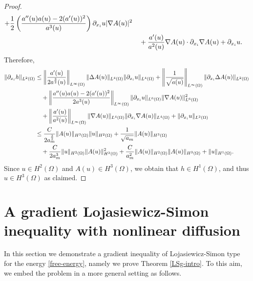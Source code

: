 \documentclass[11pt,reqno]{amsart}
\theoremstyle{remark}
\def\u{u}
\numberwithin{equation}{section}
\begin{document}
\begin{proof}
\begin{align}
+\frac12 \left( \frac{a''(u)a(u)- 2 (a'(u))^2}{a^3(u)} \right)  \partial_{x_i} u   | \nabla A(u)|^2
\notag
\\
&\quad + \frac{a'(u)}{a^2(u)} \nabla A(u) \cdot \partial_{x_i} \nabla A(u)
+ \partial_{x_i} u.
\label{h1}
\end{align}
Therefore, 
\begin{align}
\|\partial_{x_i} h\|_{L^2(\Omega)}
&\leq \left\|\frac{a'(u)}{2a^\frac32 (u)}\right\|_{L^\infty(\Omega)}\| \Delta A(u)\|_{L^4(\Omega)}\| \partial_{x_i} u\|_{L^4(\Omega)}
+ \left\|\frac{1}{\sqrt{a(u)}}\right\|_{L^\infty(\Omega)}\| \partial_{x_i}\Delta A(u)\|_{L^2(\Omega)}
\notag
\\
&\quad+\left\|\frac{a''(u)a(u)- 2 (a'(u))^2}{2a^3(u)} \right\|_{L^\infty(\Omega)}\|  \partial_{x_i} u\|_{L^6(\Omega)}\| \nabla A(u)\|_{L^6(\Omega)}^2
\notag
\\
&\quad  +\left\|\frac{a'(u)}{a^2(u)}\right\|_{L^\infty(\Omega)}\| \nabla A(u)\|_{L^4(\Omega)} \|\partial_{x_i} \nabla A(u)\|_{L^4(\Omega)}
+ \|\partial_{x_i} u\|_{L^2(\Omega)}
\notag
\\
& \leq
\frac{C}{2a_m^\frac32}\|A(u)\|_{H^3(\Omega)}\| u\|_{H^2(\Omega)}
+ \frac{1}{\sqrt{a_m}}\|A(u)\|_{H^3(\Omega)}
\notag
\\
&\quad+\frac{C}{2a_m^3}\|u\|_{H^2(\Omega)}\|A(u)\|_{H^2(\Omega)}^2
  +\frac{C}{a_m^2}\|A(u)\|_{H^2(\Omega)}\|A(u)\|_{H^3(\Omega)}
+ \|u\|_{H^1(\Omega)}.
\label{h2}
\end{align}
Since $u \in H^2(\Omega)$ and $A(u) \in H^3(\Omega)$, we obtain that $h \in H^1(\Omega)$, and thus $\u\in H^3(\Omega)$ as claimed.
\end{proof}


\section{A gradient Lojasiewicz-Simon inequality with nonlinear diffusion}
\label{LSineq}
In this section we demonstrate a gradient inequality of Lojasiewicz-Simon
type for the energy \eqref{free-energy}, namely we prove Theorem \ref{LSg-intro}. To this aim, we embed the problem in a more general setting as follows.
\end{document}
